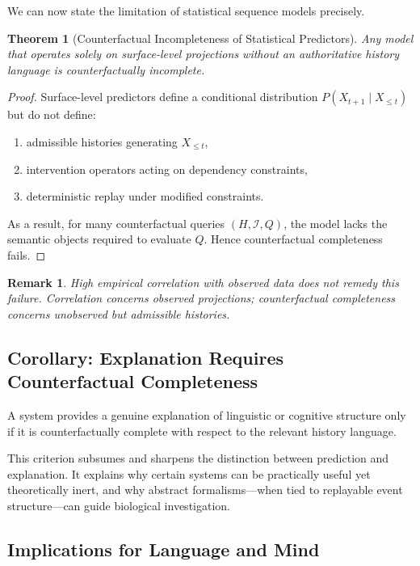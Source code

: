 \documentclass[11pt]{article}
\newtheorem{remark}{Remark}
\newtheorem{theorem}{Theorem}
\begin{document}
We can now state the limitation of statistical sequence models precisely.

\begin{theorem}[Counterfactual Incompleteness of Statistical Predictors]
Any model that operates solely on surface-level projections without an authoritative history language is counterfactually incomplete.
\end{theorem}

\begin{proof}
Surface-level predictors define a conditional distribution $P(X_{t+1}\mid X_{\leq t})$ but do not define:
\begin{enumerate}
  \item admissible histories generating $X_{\leq t}$,
  \item intervention operators acting on dependency constraints,
  \item deterministic replay under modified constraints.
\end{enumerate}
As a result, for many counterfactual queries $(H,\mathcal{I},Q)$, the model lacks the semantic objects required to evaluate $Q$. Hence counterfactual completeness fails.
\end{proof}

\begin{remark}
High empirical correlation with observed data does not remedy this failure. Correlation concerns observed projections; counterfactual completeness concerns unobserved but admissible histories.
\end{remark}

\subsection{Corollary: Explanation Requires Counterfactual Completeness}

\begin{corollary}
A system provides a genuine explanation of linguistic or cognitive structure only if it is counterfactually complete with respect to the relevant history language.
\end{corollary}

This criterion subsumes and sharpens the distinction between prediction and explanation. It explains why certain systems can be practically useful yet theoretically inert, and why abstract formalisms—when tied to replayable event structure—can guide biological investigation.

\subsection{Implications for Language and Mind}
\end{document}
